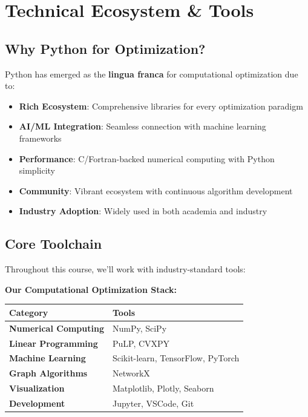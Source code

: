 \documentclass[
  letterpaper,
  DIV=11,
  numbers=noendperiod]{scrreprt}
\providecommand{\tightlist}{%
  \setlength{\itemsep}{0pt}\setlength{\parskip}{0pt}}
\begin{document}
\section{Technical Ecosystem \& Tools}\label{technical-ecosystem-tools}

\subsection{Why Python for
Optimization?}\label{why-python-for-optimization}

Python has emerged as the \textbf{lingua franca} for computational
optimization due to:

\begin{itemize}
\tightlist
\item
  \textbf{Rich Ecosystem}: Comprehensive libraries for every
  optimization paradigm
\item
  \textbf{AI/ML Integration}: Seamless connection with machine learning
  frameworks
\item
  \textbf{Performance}: C/Fortran-backed numerical computing with Python
  simplicity
\item
  \textbf{Community}: Vibrant ecosystem with continuous algorithm
  development
\item
  \textbf{Industry Adoption}: Widely used in both academia and industry
\end{itemize}

\subsection{Core Toolchain}\label{core-toolchain}

Throughout this course, we'll work with industry-standard tools:

\textbf{Our Computational Optimization Stack:}

\begin{longtable}[]{@{}ll@{}}
\toprule\noalign{}
Category & Tools \\
\midrule\noalign{}
\endhead
\bottomrule\noalign{}
\endlastfoot
\textbf{Numerical Computing} & NumPy, SciPy \\
\textbf{Linear Programming} & PuLP, CVXPY \\
\textbf{Machine Learning} & Scikit-learn, TensorFlow, PyTorch \\
\textbf{Graph Algorithms} & NetworkX \\
\textbf{Visualization} & Matplotlib, Plotly, Seaborn \\
\textbf{Development} & Jupyter, VSCode, Git \\
\end{longtable}
\end{document}
